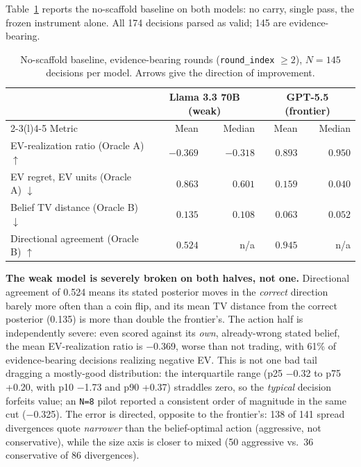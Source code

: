 \documentclass[
  10pt,
]{article}
\begin{document}
Table~\ref{tab:1} reports the no-scaffold baseline on both models: no carry, single pass, the frozen instrument alone. All 174 decisions parsed as valid; 145 are evidence-bearing.

\begin{table}[htbp]
\centering
\footnotesize
\caption{No-scaffold baseline, evidence-bearing rounds (\texttt{round\_index} $\geq 2$), $N=145$ decisions per model. Arrows give the direction of improvement.}
\label{tab:1}
\begin{tabular}{@{}lrrrr@{}}
\toprule
& \multicolumn{2}{c}{Llama 3.3 70B (weak)} & \multicolumn{2}{c}{GPT-5.5 (frontier)} \\
\cmidrule(lr){2-3}\cmidrule(l){4-5}
Metric & Mean & Median & Mean & Median \\
\midrule
EV-realization ratio (Oracle A) $\uparrow$ & $-0.369$ & $-0.318$ & $0.893$ & $0.950$ \\
EV regret, EV units (Oracle A) $\downarrow$ & $0.863$ & $0.601$ & $0.159$ & $0.040$ \\
Belief TV distance (Oracle B) $\downarrow$ & $0.135$ & $0.108$ & $0.063$ & $0.052$ \\
Directional agreement (Oracle B) $\uparrow$ & $0.524$ & n/a & $0.945$ & n/a \\
\bottomrule
\end{tabular}
\end{table}

\textbf{The weak model is severely broken on both halves, not one.} Directional agreement of 0.524 means its stated posterior moves in the \emph{correct} direction barely more often than a coin flip, and its mean TV distance from the correct posterior (0.135) is more than double the frontier's. The action half is independently severe: even scored against its \emph{own}, already-wrong stated belief, the mean EV-realization ratio is −0.369, worse than not trading, with 61\% of evidence-bearing decisions realizing negative EV. This is not one bad tail dragging a mostly-good distribution: the interquartile range (p25 −0.32 to p75 +0.20, with p10 −1.73 and p90 +0.37) straddles zero, so the \emph{typical} decision forfeits value; an \texttt{N=8} pilot reported a consistent order of magnitude in the same cut (−0.325). The error is directed, opposite to the frontier's: 138 of 141 spread divergences quote \emph{narrower} than the belief-optimal action (aggressive, not conservative), while the size axis is closer to mixed (50 aggressive vs.~36 conservative of 86 divergences).
\end{document}

